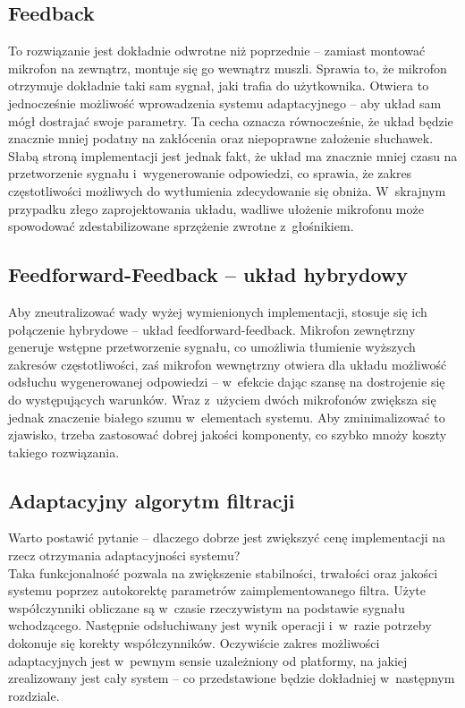\subsection{Feedback}
\label{feedback}
To rozwiązanie jest dokładnie odwrotne niż poprzednie -- zamiast montować mikrofon na zewnątrz, montuje się go wewnątrz muszli. Sprawia to, że mikrofon otrzymuje dokładnie taki sam sygnał, jaki trafia do użytkownika. Otwiera to jednocześnie możliwość wprowadzenia systemu adaptacyjnego -- aby układ sam mógł dostrajać swoje parametry. Ta cecha oznacza równocześnie, że układ będzie znacznie mniej podatny na zakłócenia oraz niepoprawne założenie słuchawek.\\
Słabą stroną implementacji jest jednak fakt, że układ ma znacznie mniej czasu na przetworzenie sygnału i~wygenerowanie odpowiedzi, co sprawia, że zakres częstotliwości możliwych do wytłumienia zdecydowanie się obniża. W~skrajnym przypadku złego zaprojektowania układu, wadliwe ułożenie mikrofonu może spowodować zdestabilizowane sprzężenie zwrotne z~głośnikiem.
\subsection{Feedforward-Feedback -- układ hybrydowy}
\label{hybrid}
Aby zneutralizować wady wyżej wymienionych implementacji, stosuje się ich połączenie hybrydowe -- układ feedforward-feedback. Mikrofon zewnętrzny generuje wstępne przetworzenie sygnału, co umożliwia tłumienie wyższych zakresów częstotliwości, zaś mikrofon wewnętrzny otwiera dla układu możliwość odsłuchu wygenerowanej odpowiedzi -- w~efekcie dając szansę na dostrojenie się do występujących warunków. Wraz z~użyciem dwóch mikrofonów zwiększa się jednak znaczenie białego szumu w~elementach systemu. Aby zminimalizować to zjawisko, trzeba zastosować dobrej jakości komponenty, co szybko mnoży koszty takiego rozwiązania.
\subsection{Adaptacyjny algorytm filtracji}
\label{FIRLMS}
Warto postawić pytanie -- dlaczego dobrze jest zwiększyć cenę implementacji na rzecz otrzymania adaptacyjności systemu?\\
Taka funkcjonalność pozwala na zwiększenie stabilności, trwałości oraz jakości systemu poprzez autokorektę parametrów zaimplementowanego filtra. Użyte współczynniki obliczane są w~czasie rzeczywistym na podstawie sygnału wchodzącego. Następnie odsłuchiwany jest wynik operacji i~w~razie potrzeby dokonuje się korekty współczynników. %
 Oczywiście zakres możliwości adaptacyjnych jest w~pewnym sensie uzależniony od platformy, na jakiej zrealizowany jest cały system -- co przedstawione będzie dokładniej w~następnym rozdziale.